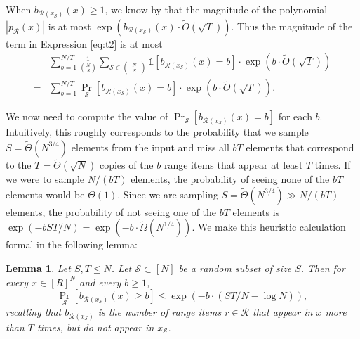 \documentclass[11pt, letterpaper, fleqn]{article}
\newtheorem{lemma}[theorem]{Lemma}
\theoremstyle{plain}
\newcommand{\tO}{\tilde{O}}
\newcommand{\tOmega}{\tilde{\Omega}}
\newcommand{\tTheta}{\tilde{\Theta}}
\newcommand{\id}{{\mathds{1}}}
\newcommand{\Rcal}{\mathcal{R}}
\newcommand{\Scal}{\mathcal{S}}
\begin{document}
When $b_{\Rcal(x_\Scal)}(x) \geq 1$, we know by  that the magnitude of the polynomial $|p_\Rcal(x)|$ is at most $\exp\left(b_{\Rcal(x_\Scal)}(x) \cdot \tO\left(\sqrt{T}\right)\right)$.
Thus the magnitude of the term in Expression \eqref{eq:t2} is at most
\begin{align}
    &\sum_{b=1}^{N/T} \frac{1}{\binom{N}{S}} \sum_{\Scal \in \binom{[N]}{S}}  \id[b_{\Rcal(x_\Scal)}(x)=b] \cdot \exp(b \cdot \tO(\sqrt{T})) \\
    =&\sum_{b=1}^{N/T} \Pr_{\Scal}[b_{\Rcal(x_\Scal)}(x)=b] \cdot \exp\left(b \cdot \tO\left(\sqrt{T}\right)\right).
\end{align}


We now need to compute the value of $\Pr_{\Scal}[b_{\Rcal(x_\Scal)}(x)=b]$ for each $b$. Intuitively, this roughly corresponds to the probability that we sample $S=\tTheta(N^{3/4})$ elements from the input and miss all $bT$ elements that correspond to the $T = \tTheta(\sqrt{N})$ copies of the $b$ range items that appear at least $T$ times. 
If we were to sample $N / (bT)$ elements, the probability of seeing none of the $b T$ elements would be $\Theta(1)$. 
Since we are sampling $S=\tTheta(N^{3/4}) \gg N / (bT)$ elements, the probability of not seeing one of the $bT$ elements is ${\exp(-bST/N)} = {\exp(-b \cdot \tOmega(N^{1/4}))}$. We make this heuristic calculation formal in the following lemma:

\begin{lemma} \label{lem:prob-b}
Let $S, T \le N$. Let $\Scal \subset [N]$ be a random subset of size $S$. Then for every $x \in [R]^N$ and every $b \ge 1$,
\[\Pr_{\Scal}[b_{\Rcal(x_\Scal)}(x) \ge b] \leq {\exp(-b \cdot (ST/N - \log N))},\]
recalling that $b_{\Rcal(x_\Scal)}$ is the number of range items $r \in \Rcal$ that appear in $x$ more than $T$ times, but do not appear in $x_\Scal$.
\end{lemma}
\end{document}
